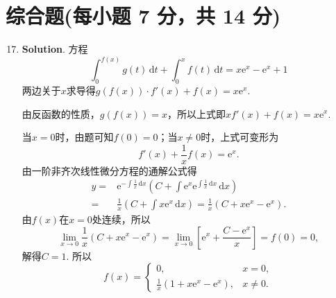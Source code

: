 \documentclass[../main.tex]{subfiles}
\begin{document}
\section{综合题(每小题 7 分，共 14 分)}
\begin{enumerate}
    \setcounter{enumi}{16}
    \item \textbf{Solution}. 方程
          \[
              \int_{0}^{f(x)}g(t)\,\mathrm{d}t+\int_{0}^{x}
              f(t)\,\mathrm{d}t=x\mathrm{e}^{x}-\mathrm{e}^{x}+1
          \]
          两边关于$x$求导得$g(f(x))\cdot f'(x)+f(x)=x\mathrm{e}^{x}$.

          由反函数的性质，$g(f(x))=x$，所以上式即$xf'(x)+f(x)=x\mathrm{e}^{x}$.

          当$x=0$时，由题可知$f(0)=0$；当$x\neq0$时，上式可变形为
          \[
              f'(x)+\frac{1}{x}f(x)=\mathrm{e}^{x}.
          \]
          由一阶非齐次线性微分方程的通解公式得
          \[
              \begin{aligned}
                  y = {} & \mathrm{e}^{-\int\frac{1}{x}\,\mathrm{d}x}\left(C+\int\mathrm{e}^{x}\mathrm{e}^{\int\frac{1}{x}\,\mathrm{d}x}\,\mathrm{d}x\right) \\
                  = {}   & \frac{1}{x}\left(C+\int x\mathrm{e}^{x}\,\mathrm{d}x\right) = \frac{1}{x}\left(C+x\mathrm{e}^{x}-\mathrm{e}^{x}\right).
              \end{aligned}
          \]
          由$f(x)$在$x=0$处连续，所以
          \[
              \lim_{x\to0}\frac{1}{x}\left(C+x\mathrm{e}^{x}-
              \mathrm{e}^{x}\right)=\lim_{x\to0}\left[\mathrm{e}^{x}+\frac{C-\mathrm{e}^{x}}{x}
                  \right]=f(0)=0,
          \]
          解得$C=1$. 所以
          \[
              f(x)=
              \begin{cases}
                  0,                                                        & x=0,    \\
                  \frac{1}{x}\left(1+x\mathrm{e}^{x}-\mathrm{e}^{x}\right), & x\neq0.
              \end{cases}
          \]


\end{enumerate}
\end{document}
